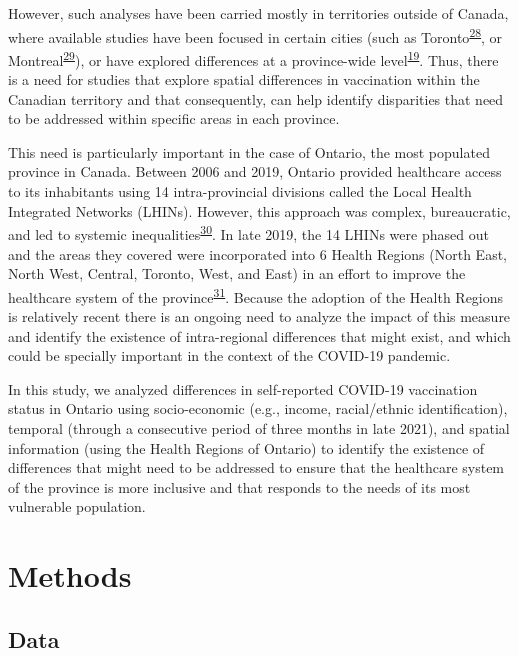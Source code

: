 \documentclass[
  letterpaper,
  DIV=11,
  numbers=noendperiod]{scrartcl}
\begin{document}
However, such analyses have been carried mostly in territories outside
of Canada, where available studies have been focused in certain cities
(such as Toronto\textsuperscript{\protect\hyperlink{ref-choi2021}{28}},
or Montreal\textsuperscript{\protect\hyperlink{ref-mckinnon2021}{29}}),
or have explored differences at a province-wide
level\textsuperscript{\protect\hyperlink{ref-guay2022}{19}}. Thus, there
is a need for studies that explore spatial differences in vaccination
within the Canadian territory and that consequently, can help identify
disparities that need to be addressed within specific areas in each
province.

This need is particularly important in the case of Ontario, the most
populated province in Canada. Between 2006 and 2019, Ontario provided
healthcare access to its inhabitants using 14 intra-provincial divisions
called the Local Health Integrated Networks (LHINs). However, this
approach was complex, bureaucratic, and led to systemic
inequalities\textsuperscript{\protect\hyperlink{ref-tsasis2012}{30}}. In
late 2019, the 14 LHINs were phased out and the areas they covered were
incorporated into 6 Health Regions (North East, North West, Central,
Toronto, West, and East) in an effort to improve the healthcare system
of the province\textsuperscript{\protect\hyperlink{ref-dong2022}{31}}.
Because the adoption of the Health Regions is relatively recent there is
an ongoing need to analyze the impact of this measure and identify the
existence of intra-regional differences that might exist, and which
could be specially important in the context of the COVID-19 pandemic.

In this study, we analyzed differences in self-reported COVID-19
vaccination status in Ontario using socio-economic (e.g., income,
racial/ethnic identification), temporal (through a consecutive period of
three months in late 2021), and spatial information (using the Health
Regions of Ontario) to identify the existence of differences that might
need to be addressed to ensure that the healthcare system of the
province is more inclusive and that responds to the needs of its most
vulnerable population.

\hypertarget{methods}{%
\section{Methods}\label{methods}}

\hypertarget{sec-data}{%
\subsection{Data}\label{sec-data}}
\end{document}
